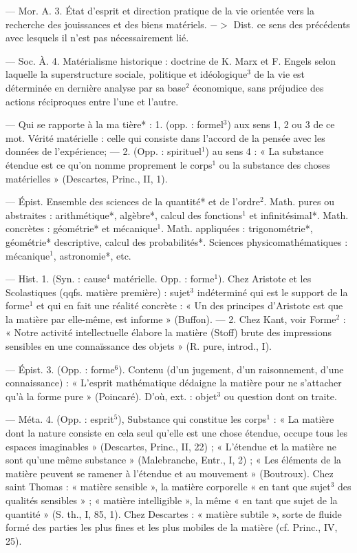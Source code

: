 \begin{itemize}[leftmargin=1cm, label=, itemsep=1pt]
— Mor. A. 3. État d'esprit et
direction pratique de la vie orientée
vers la recherche des jouissances et
des biens matériels. $->$ Dist. ce
sens des précédents avec lesquels
il n’est pas nécessairement lié.

— Soc. À. 4. Matérialisme historique : doctrine de K. Marx et
F. Engels selon laquelle la superstructure sociale, politique et idéologique$^3$ de la vie est déterminée en
dernière analyse par sa base$^2$ économique, sans préjudice des actions
réciproques entre l’une et l’autre.

 — Qui se rapporte à la ma
tière* : 1. (opp. : formel$^3$) aux sens 1,
2 ou 3 de ce mot. Vérité matérielle :
celle qui consiste dans l’accord de
la pensée avec les données de l’expérience; — 2. (Opp. : spirituel$^1$) au
sens 4 : « La substance étendue est
ce qu’on nomme proprement le
corps$^1$ ou la substance des choses
matérielles » (Descartes, Princ.,
II, 1).

 — Épist. Ensemble
des sciences de la quantité* et de
l’ordre$^2$. Math. pures ou abstraites :
arithmétique*, algèbre*, calcul des
fonctions$^1$ et infinitésimal*. Math.
concrètes : géométrie* et mécanique$^1$.
Math. appliquées : trigonométrie*,
géométrie* descriptive, calcul des
probabilités*. Sciences  physicomathématiques : mécanique$^1$, astronomie*, etc.

 — Hist. 1. (Syn. : cause$^4$ matérielle. Opp. : forme$^1$). Chez Aristote
et les Scolastiques (qqfs. matière première) : sujet$^3$ indéterminé qui est le
support de la forme$^1$ et qui en fait
une réalité concrète : « Un des principes d’Aristote est que la matière par elle-même, est informe » (Buffon). — 2. Chez Kant, voir Forme$^2$ :
« Notre activité intellectuelle élabore
la matière (Stoff) brute des impressions sensibles en une connaïssance
des objets » (R. pure, introd., I).

— Épist. 3. (Opp. : forme$^6$). Contenu (d'un jugement, d’un raisonnement, d’une connaissance) : « L’esprit mathématique dédaigne la matière pour ne s’attacher qu'à la
forme pure » (Poincaré). D'où, ext. :
objet$^3$ ou question dont on traite.

— Méta. 4. (Opp. : esprit$^5$), Substance qui constitue les corps$^1$ : « La
matière dont la nature consiste en
cela seul qu’elle est une chose étendue, occupe tous les espaces imaginables » (Descartes, Princ., II, 22) ;
« L’étendue et la matière ne sont
qu'une même substance » (Malebranche, Entr., I, 2) ; « Les éléments
de la matière peuvent se ramener à
l'étendue et au mouvement » (Boutroux). Chez saint Thomas : « matière sensible », la matière corporelle
« en tant que sujet$^3$ des qualités
sensibles » ; « matière intelligible »,
la même « en tant que sujet de la
quantité » (S. th., I, 85, 1). Chez Descartes : « matière subtile », sorte de
fluide formé des parties les plus
fines et les plus mobiles de la matière (cf. Princ., IV, 25).


\end{itemize}
